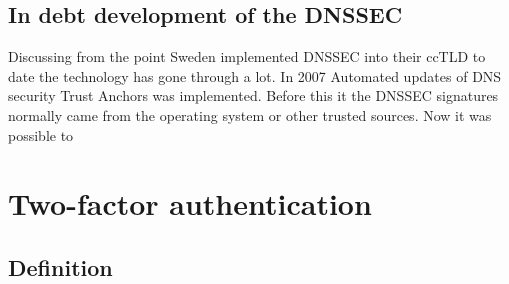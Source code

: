\documentclass{article}
\begin{document}
		\subsection{In debt development of the DNSSEC}
		Discussing from the point Sweden implemented DNSSEC into their ccTLD to date the technology has gone through a lot. In 2007 Automated updates of DNS security Trust Anchors was implemented.\cite{trustAnchor} 
		Before this it the DNSSEC signatures normally came from the operating system or other trusted sources. Now it was possible to\cite{icann}

    
	\clearpage
	\section{Two-factor authentication}
		\subsection{Definition}
        
    \clearpage
	\nocite{*}
	
	
\end{document}
